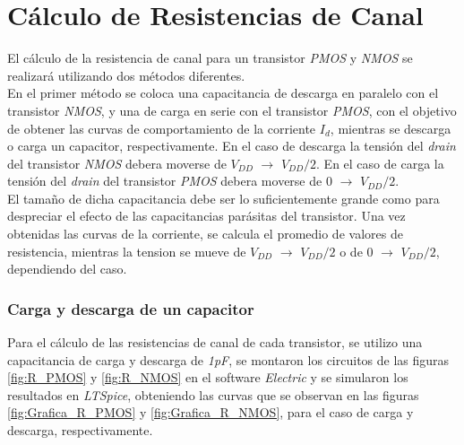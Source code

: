 \documentclass[12pt,a4paper]{article} %
\begin{document}
\section{Cálculo de Resistencias de Canal}

El cálculo de la resistencia de canal para un transistor \textit{PMOS} y \textit{NMOS} se realizará utilizando dos métodos diferentes.\\

En el primer método se coloca una capacitancia de descarga en paralelo con el transistor \textit{NMOS}, y una de carga en serie con el transistor \textit{PMOS}, con el objetivo de obtener las curvas de comportamiento de la corriente $\textit{I}_{\textit{d}}$, mientras se descarga o carga un capacitor, respectivamente. En el caso de descarga la tensión del \textit{drain} del transistor \textit{NMOS} debera moverse de $\textit{V}_{\textit{DD}}$ $\longrightarrow$ $\textit{V}_{\textit{DD}}/2$. En el caso de carga la tensión del \textit{drain} del transistor \textit{PMOS} debera moverse de $\textit{0}$ $\longrightarrow$ $\textit{V}_{\textit{DD}}/2$.\\

El tamaño de dicha capacitancia debe ser lo suficientemente grande como para despreciar el efecto de las capacitancias parásitas del transistor. Una vez obtenidas las curvas de la corriente, se calcula el promedio de valores de resistencia, mientras la tension se mueve de $\textit{V}_{\textit{DD}}$ $\longrightarrow$ $\textit{V}_{\textit{DD}}/2$ o de $\textit{0}$ $\longrightarrow$ $\textit{V}_{\textit{DD}}/2$, dependiendo del caso.\\


\subsubsection{Carga y descarga de un capacitor}

Para el cálculo de las resistencias de canal de cada transistor, se utilizo una capacitancia de carga y descarga de \textit{1pF}, se montaron los circuitos de las figuras \ref{fig:R_PMOS} y \ref{fig:R_NMOS} en el software \textit{Electric} y se simularon los resultados en  \textit{LTSpice}, obteniendo las curvas que se observan en las figuras \ref{fig:Grafica_R_PMOS} y \ref{fig:Grafica_R_NMOS}, para el caso de carga y descarga, respectivamente.\\
\end{document}
